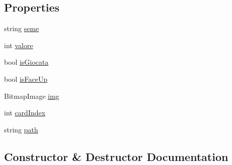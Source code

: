 \subsection*{Properties}
\begin{DoxyCompactItemize}
\item 
string \hyperlink{class_fontanella_1_1_simone_1_1__5i_1_1_briscola_1_1_card_a5b099fd5db757dd88b5d3b402d97e638}{seme}
\item 
int \hyperlink{class_fontanella_1_1_simone_1_1__5i_1_1_briscola_1_1_card_a0f375e6265e37cf5a126337790237ebe}{valore}
\item 
bool \hyperlink{class_fontanella_1_1_simone_1_1__5i_1_1_briscola_1_1_card_a367b0d4bca4b6b60caf8de05b452e1e9}{is\+Giocata}
\item 
bool \hyperlink{class_fontanella_1_1_simone_1_1__5i_1_1_briscola_1_1_card_a802c2936b18253d3341d82b9dd531f5a}{is\+Face\+Up}
\item 
Bitmap\+Image \hyperlink{class_fontanella_1_1_simone_1_1__5i_1_1_briscola_1_1_card_ae310d70e334b89c1feea95ca77d88633}{img}
\item 
int \hyperlink{class_fontanella_1_1_simone_1_1__5i_1_1_briscola_1_1_card_a171a027469d728688df3f9172e04a3a0}{card\+Index}
\item 
string \hyperlink{class_fontanella_1_1_simone_1_1__5i_1_1_briscola_1_1_card_a664e60aa4ec3d2cc6b22d67ca0649335}{path}
\end{DoxyCompactItemize}


\subsection{Constructor \& Destructor Documentation}
\hypertarget{class_fontanella_1_1_simone_1_1__5i_1_1_briscola_1_1_card_a998d2e047284254fc568cbe8c2a49776}{}\label{class_fontanella_1_1_simone_1_1__5i_1_1_briscola_1_1_card_a998d2e047284254fc568cbe8c2a49776} 
